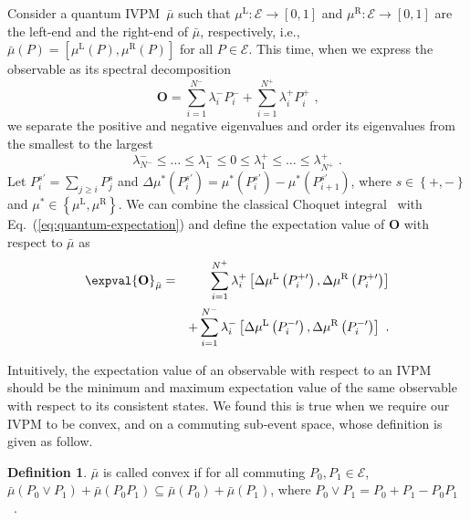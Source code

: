 \documentclass[english,reprint, aps, prl,superscriptaddress, showpacs,
showkeys, longbibliography, amsmath, amssymb]{revtex4-1}
\theoremstyle{plain}
\theoremstyle{definition}
\newtheorem{definition}[thm]{Definition}
\newcommand{\events}{\ensuremath{\mathcal{E}}}
\newcommand{\mul}{\ensuremath{\mu^{\mathrm{L}}}}
\newcommand{\mur}{\ensuremath{\mu^{\mathrm{R}}}}
\begin{document}
Consider a quantum IVPM~$\bar{\mu}$ such that $\mul:\events\rightarrow\left[0,1\right]$
and $\mur:\events\rightarrow\left[0,1\right]$ are the left-end and
the right-end of $\bar{\mu}$, respectively, i.e., $\bar{\mu}\left(P\right)=\left[\mul\left(P\right),\mur\left(P\right)\right]$
for all $P\in\events$. This time, when we express the observable
as its spectral decomposition
\begin{equation}
\mathbf{O}=\sum_{i=1}^{N^{-}}\lambda_{i}^{-}P_{i}^{-}+\sum_{i=1}^{N^{+}}\lambda_{i}^{+}P_{i}^{+}\textrm{ ,}\label{eq:spectrum-decomposition}
\end{equation}
we separate the positive and negative eigenvalues and order its eigenvalues
from the smallest to the largest 
\begin{equation}
\lambda_{N^{-}}^{-}\le\ldots\le\lambda_{1}^{-}\le0\le\lambda_{1}^{+}\le\ldots\le\lambda_{N^{+}}^{+}\textrm{ .}
\end{equation}
Let $P_{i}^{s\prime}=\sum_{j\ge i}P_{j}^{s}$ and $\Delta\mu^{*}\left(P_{i}^{s\prime}\right)=\mu^{*}\left(P_{i}^{s\prime}\right)-\mu^{*}\left(P_{i+1}^{s\prime}\right)$,
where $s\in\left\{ +,-\right\} $ and $\mu^{*}\in\left\{ \mul,\mur\right\} $.
We can combine the classical Choquet integral~\cite{Vitali1925,Choquet1954,GilboaSchmeidler1994,Grabisch2016}
with Eq.~(\ref{eq:quantum-expectation}) and define the expectation
value of $\mathbf{O}$ with respect to $\bar{\mu}$ as
\begin{eqnarray}
\expval{\mathbf{O}}_{\bar{\mu}} & = & \sum_{i=1}^{N^{+}}\lambda_{i}^{+}\left[\Delta\mul\left(P_{i}^{+\prime}\right),\Delta\mur\left(P_{i}^{+\prime}\right)\right]\nonumber \\
 &  & +\sum_{i=1}^{N^{-}}\lambda_{i}^{-}\left[\Delta\mul\left(P_{i}^{-\prime}\right),\Delta\mur\left(P_{i}^{-\prime}\right)\right]\textrm{ .}\label{eq:quantum-interval-expectation}
\end{eqnarray}

Intuitively, the expectation value of an observable with respect to
an IVPM should be the minimum and maximum expectation value of the
same observable with respect to its consistent states. We found this
is true when we require our IVPM to be convex, and on a commuting
sub-event space, whose definition is given as follow.

\begin{definition}$\bar{\mu}$ is called convex if for all commuting
$P_{0},P_{1}\in\events$, $\bar{\mu}\left(P_{0}\vee P_{1}\right)+\bar{\mu}\left(P_{0}P_{1}\right)\subseteq\bar{\mu}\left(P_{0}\right)+\bar{\mu}\left(P_{1}\right)$,
where $P_{0}\vee P_{1}=P_{0}+P_{1}-P_{0}P_{1}$~\cite{Griffiths2003}.\end{definition}
\end{document}
